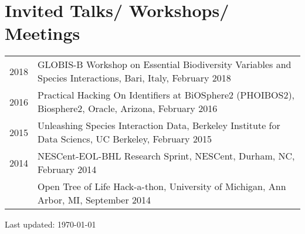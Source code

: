 \documentclass[11pt,fullpage]{article}
\begin{document}


\section*{Invited Talks/ Workshops/ Meetings}

\begin{longtable}{p{0.5in}|p{5.5in}}

 

 2018 
 & GLOBIS-B Workshop on Essential Biodiversity Variables and Species Interactions, Bari, Italy, February 2018 \\ 

 2016 &  Practical Hacking On Identifiers at BiOSphere2 (PHOIBOS2), Biosphere2, Oracle, Arizona, February 2016 \\
 
 2015 &  Unleashing Species Interaction Data, Berkeley Institute for Data Sciencs, UC Berkeley, February 2015 \\

 2014 & NESCent-EOL-BHL Research Sprint, NESCent, Durham, NC, February 2014 \\ 
  & Open Tree of Life Hack-a-thon, University of Michigan, Ann Arbor, MI, September 2014 \\ 

\end{longtable}






\bigskip
\begin{center}
  \begin{footnotesize}
    Last updated: \today
  \end{footnotesize}
\end{center}

\end{document}
